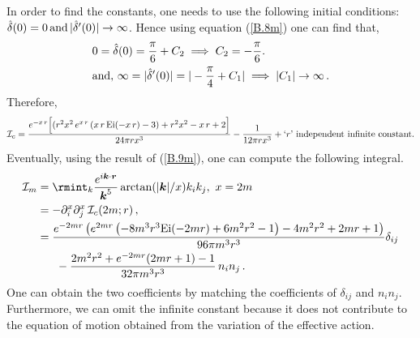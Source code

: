 In order to find the constants, one needs to use the following initial conditions: $\Hat{\delta}(0)=0\,\text{and}\,|\Hat{\delta}'(0)|\rightarrow \infty$. Hence using equation (\ref{B.8m}) one can find that, 
\begin{align}
    \begin{split}
      &  0=\Hat{\delta}(0)=\frac{\pi}{6}+C_2\implies C_2=-\frac{\pi}{6}.\\ &
      \text{and},\,\infty=|\Hat{\delta}'(0)|=|-\frac{\pi}{4}+C_1|\implies |C_1|\rightarrow \infty\,.
    \end{split}
\end{align}
Therefore,
\begin{align}
    \begin{split}
        \mathcal{I}_c=\frac{e^{- x\,r} \Big[(r^2 x^2\, e^{x\,r}\, (x\,r\, \text{Ei}(-x\,r)-3)+r^2 x^2-x\,r+2\Big]}{24 \pi  r x^3}-\frac{1}{12\pi r x^3}+ \text{$`r$' independent infinite constant.}\label{B.9m}
    \end{split}
 \end{align}
Eventually, using the result of (\ref{B.9m}), one can compute the following integral.
\begin{align}
    \begin{split}
     \mathcal{I}_m &= \rmint_{k}\frac{e^{i\boldsymbol{k}\cdot \boldsymbol{r}}}{\boldsymbol{k}^5}\arctan(|\boldsymbol{k}|/x)k_ik_j,\,\,x=2m\\ &
     =-\partial^{x}_{i}\partial^{x}_{j}\,\mathcal{I}_c(2m;r)\,,\\ &
     =\frac{e^{-2 m r} \left(e^{2 m r} \left(-8 m^3 r^3 \text{Ei}(-2 m r)+6 m^2 r^2-1\right)-4 m^2 r^2+2 m r+1\right)}{96 \pi  m^3 r^3}\delta_{ij}\\ &
     \,\,\,\,\,\,\,\,\,\,-\frac{2 m^2 r^2+e^{-2 m r} (2 m r+1)-1}{32 \pi  m^3 r^3}\,n_in_j\,.
    \end{split}
\end{align}
One can obtain the two coefficients by matching the coefficients of $\delta_{ij}$ and $n_i n_j$. Furthermore, we can omit the infinite constant because it does not contribute to the equation of motion obtained from the variation of the effective action.\par 

